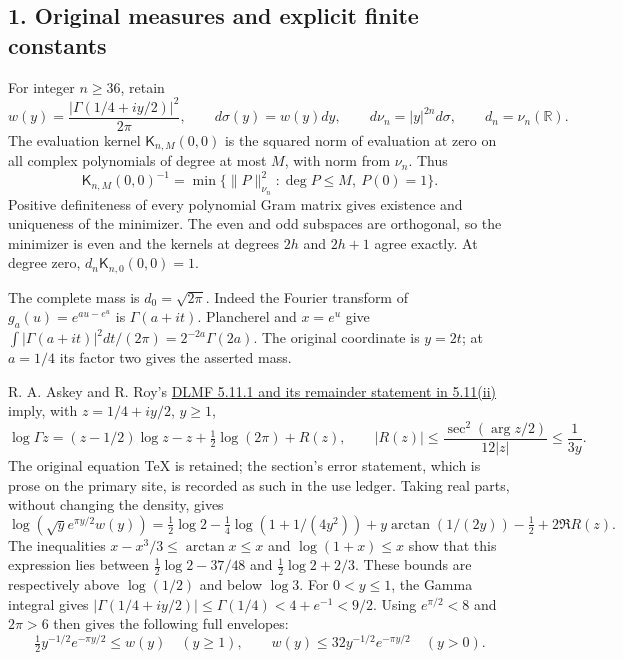 \documentclass[10pt]{article}
\begin{document}
\subsection{1. Original measures and explicit finite constants}\label{original-measures-and-explicit-finite-constants}

For integer \(n\ge36\), retain \[
 w(y)=\frac{|\Gamma(1/4+iy/2)|^2}{2\pi},\qquad
 d\sigma(y)=w(y)dy,\qquad d\nu_n=|y|^{2n}d\sigma,
 \qquad d_n=\nu_n(\mathbb R).
 \tag{EG1}
\] The evaluation kernel \(\mathsf K_{n,M}(0,0)\) is the squared norm of evaluation at zero on all complex polynomials of degree at most \(M\), with norm from \(\nu_n\). Thus \[
 \mathsf K_{n,M}(0,0)^{-1}
 =\min\{\|P\|_{\nu_n}^2:\deg P\le M,\ P(0)=1\}.
 \tag{EG2}
\] Positive definiteness of every polynomial Gram matrix gives existence and uniqueness of the minimizer. The even and odd subspaces are orthogonal, so the minimizer is even and the kernels at degrees \(2h\) and \(2h+1\) agree exactly. At degree zero, \(d_n\mathsf K_{n,0}(0,0)=1\).

The complete mass is \(d_0=\sqrt{2\pi}\). Indeed the Fourier transform of \(g_a(u)=e^{au-e^u}\) is \(\Gamma(a+it)\). Plancherel and \(x=e^u\) give \(\int|\Gamma(a+it)|^2dt/(2\pi)=2^{-2a}\Gamma(2a)\). The original coordinate is \(y=2t\); at \(a=1/4\) its factor two gives the asserted mass.

R. A. Askey and R. Roy's \href{https://dlmf.nist.gov/5.11\#ii}{DLMF 5.11.1 and its remainder statement in 5.11(ii)} imply, with \(z=1/4+iy/2\), \(y\ge1\), \[
 \log\Gamma z=(z-1/2)\log z-z+\tfrac12\log(2\pi)+R(z),
 \qquad |R(z)|\le\frac{\sec^2(\arg z/2)}{12|z|}\le\frac1{3y}.
\] The original equation TeX is retained; the section's error statement, which is prose on the primary site, is recorded as such in the use ledger. Taking real parts, without changing the density, gives \[
 \log(\sqrt y e^{\pi y/2}w(y))
 =\tfrac12\log2-\tfrac14\log(1+1/(4y^2))
 +y\arctan(1/(2y))-\tfrac12+2\Re R(z).
\] The inequalities \(x-x^3/3\le\arctan x\le x\) and \(\log(1+x)\le x\) show that this expression lies between \(\tfrac12\log2-37/48\) and \(\tfrac12\log2+2/3\). These bounds are respectively above \(\log(1/2)\) and below \(\log3\). For \(0<y\le1\), the Gamma integral gives \(|\Gamma(1/4+iy/2)|\le\Gamma(1/4)<4+e^{-1}<9/2\). Using \(e^{\pi/2}<8\) and \(2\pi>6\) then gives the following full envelopes: \[
 \tfrac12 y^{-1/2}e^{-\pi y/2}\le w(y)\quad(y\ge1),
 \qquad w(y)\le32y^{-1/2}e^{-\pi y/2}\quad(y>0).
 \tag{EG3}
\]
\end{document}
